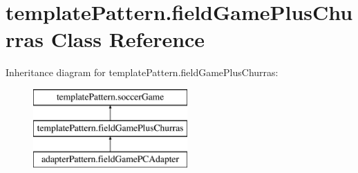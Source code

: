 \hypertarget{classtemplate_pattern_1_1field_game_plus_churras}{}\section{template\+Pattern.\+field\+Game\+Plus\+Churras Class Reference}
\label{classtemplate_pattern_1_1field_game_plus_churras}
Inheritance diagram for template\+Pattern.\+field\+Game\+Plus\+Churras\+:\begin{figure}[H]
\begin{center}
\leavevmode
\includegraphics[height=3.000000cm]{classtemplate_pattern_1_1field_game_plus_churras}
\end{center}
\end{figure}
